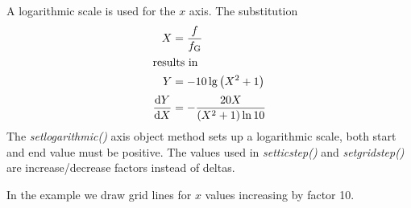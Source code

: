 \documentclass[origlongtable]{scrartcl}
\begin{document}
A logarithmic scale is used for the \(x\) axis.
The substitution
\begin{align*}
X&=\frac{f}{f_{\text{G}}}\\
\intertext{results in}
Y&=-10\lg{\left(X^2+1\right)}\\[0.2em]
\frac{\mathrm{d} Y}{\mathrm{d} X}&=-\frac{20X}{\left(X^2+1\right)\ln{10}}
\end{align*}
The
\textit{set\textunderscore{}logarithmic()\/} axis object method
sets up a logarithmic scale, both start and end value must be positive.
The values used in
\textit{set\textunderscore{}tic\textunderscore{}step()\/} and
\textit{set\textunderscore{}grid\textunderscore{}step()\/}
are increase/decrease factors instead of deltas.

In the example we draw grid lines for \(x\) values increasing by
factor 10.
\clearpage

\clearpage
\end{document}
